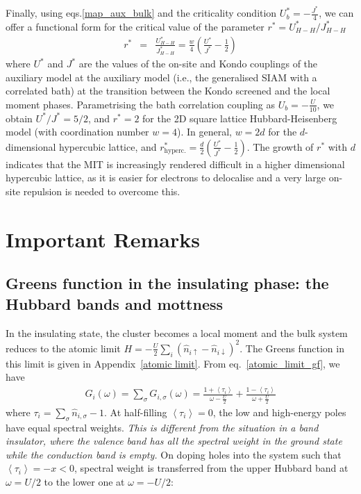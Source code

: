 \documentclass{report}
\numberwithin{equation}{section}
\begin{document}
\begin{itemize}
Finally, using eqs.\eqref{map_aux_bulk} and the criticality condition $U_{b}^{*}=-\frac{J^{*}}{4}$, we can offer a functional form for the critical value of the parameter $r^{*} = U_{H-H}^{*}/J_{H-H}^{*}$
\begin{eqnarray}
r^{*} &=& \frac{U_{H-H}^{*}}{J_{H-H}^{*}} = \frac{w}{4}\left(\frac{U^{*}}{J^{*}} - \frac{1}{2}\right)
\end{eqnarray}
where $U^{*}$ and $J^{*}$ are the values of the on-site and Kondo couplings of the auxiliary model at the auxiliary model (i.e., the generalised SIAM with a correlated bath) at the transition between the Kondo screened and the local moment phases. Parametrising the bath correlation coupling as $U_{b}=-\frac{U}{10}$, we obtain $U^{*}/J^{*}=5/2$, and $r^{*} = 2$ for the 2D square lattice Hubbard-Heisenberg model (with coordination number $w=4$). In general, $w=2d$ for the $d$-dimensional hypercubic lattice, and 
$r^{*}_\text{hyperc.} = \frac{d}{2}\left(\frac{U^{*}}{J^{*}} - \frac{1}{2}\right)$. The growth of $r^{*}$ with $d$ indicates that the MIT is increasingly rendered difficult in a higher dimensional hypercubic lattice, as it is easier for electrons to delocalise and a very large on-site repulsion is needed to overcome this.
\end{itemize}

\section{Important Remarks}
\subsection{Greens function in the insulating phase: the Hubbard bands and mottness}
In the insulating state, the cluster becomes a local moment and the bulk system reduces to the atomic limit \(H = -\frac{U}{2}\sum_i\left(\hat n_{i \uparrow} - \hat n_{i \downarrow}\right)^2\). The Greens function in this limit is given in Appendix~\ref{atomic limit}. From eq.~\ref{atomic_limit_gf}, we have
\begin{equation}\begin{aligned}
	G_{i}(\omega) = \sum_\sigma G_{i,\sigma}(\omega) = \frac{1 + \left<\tau_{i }\right>}{\omega - \frac{U}{2}} + \frac{1 - \left<\tau_{i}\right>}{\omega + \frac{U}{2}}
\end{aligned}\end{equation}
where \(\tau_i = \sum_\sigma \hat n_{i,\sigma} - 1\). At half-filling \(\left<\tau_{i}\right>=0\), the low and high-energy poles have equal spectral weights. \textit{This is different from the situation in a band insulator, where the valence band has all the spectral weight in the ground state while the conduction band is empty.} On doping holes into the system such that \(\left<\tau_{i}\right> = -x < 0\), spectral weight is transferred from the upper Hubbard band at \(\omega = U/2\) to the lower one at \(\omega = -U/2\):
\end{document}
